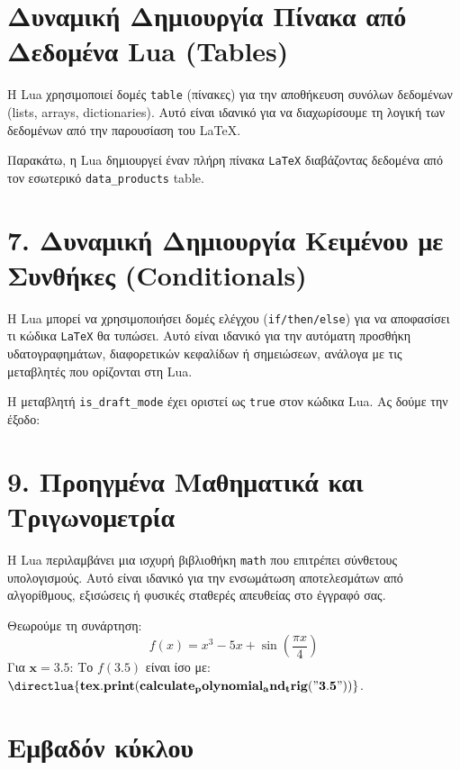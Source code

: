 \documentclass[11pt, a4paper]{article}
\begin{document}
\section{Δυναμική Δημιουργία Πίνακα από Δεδομένα Lua (Tables)}

Η Lua χρησιμοποιεί δομές \texttt{table} (πίνακες) για την αποθήκευση συνόλων δεδομένων (lists, arrays, dictionaries). Αυτό είναι ιδανικό για να διαχωρίσουμε τη λογική των δεδομένων από την παρουσίαση του \LaTeX.

\noindent Παρακάτω, η Lua δημιουργεί έναν πλήρη πίνακα \texttt{LaTeX} διαβάζοντας δεδομένα από τον εσωτερικό \texttt{data\_products} table.


\section{7. Δυναμική Δημιουργία Κειμένου με Συνθήκες (Conditionals)}

Η Lua μπορεί να χρησιμοποιήσει δομές ελέγχου (\texttt{if/then/else}) για να αποφασίσει τι κώδικα \texttt{LaTeX} θα τυπώσει. Αυτό είναι ιδανικό για την αυτόματη προσθήκη υδατογραφημάτων, διαφορετικών κεφαλίδων ή σημειώσεων, ανάλογα με τις μεταβλητές που ορίζονται στη Lua.

\noindent Η μεταβλητή \texttt{is\_draft\_mode} έχει οριστεί ως \texttt{true} στον κώδικα Lua. Ας δούμε την έξοδο:


\section{9. Προηγμένα Μαθηματικά και Τριγωνομετρία}

Η Lua περιλαμβάνει μια ισχυρή βιβλιοθήκη \texttt{math} που επιτρέπει σύνθετους υπολογισμούς. Αυτό είναι ιδανικό για την ενσωμάτωση αποτελεσμάτων από αλγορίθμους, εξισώσεις ή φυσικές σταθερές απευθείας στο έγγραφό σας.

\noindent Θεωρούμε τη συνάρτηση:
$$f(x) = x^3 - 5x + \sin\left(\frac{\pi x}{4}\right)$$
\def\XValue{3.5} Για $\mathbf{x = \XValue}$:
\noindent Το $f(\XValue)$ είναι ίσο με: $\mathbf{\directlua{
    tex.print(calculate_polynomial_and_trig("\XValue"))
}}$.
\section{Εμβαδόν κύκλου}
\end{document}
